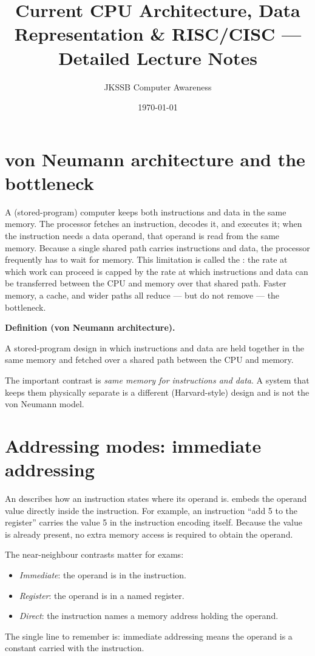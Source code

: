 \documentclass[11pt]{article}
\title{Current CPU Architecture, Data Representation \& RISC/CISC --- Detailed Lecture Notes}
\author{JKSSB Computer Awareness}
\date{\today}
\newenvironment{definitionbox}[1]{%
  \par\noindent\textbf{Definition (#1).}\ \itshape
}{\par\vspace{0.3em}}
\begin{document}
\maketitle

\section{von Neumann architecture and the bottleneck}
A  (stored-program) computer keeps both instructions and
data in the same memory. The processor fetches an instruction, decodes it,
and executes it; when the instruction needs a data operand, that operand is
read from the same memory. Because a single shared path carries instructions
and data, the processor frequently has to wait for memory. This limitation is
called the : the rate at which work can proceed is
capped by the rate at which instructions and data can be transferred between
the CPU and memory over that shared path. Faster memory, a cache, and wider
paths all reduce --- but do not remove --- the bottleneck.

\begin{definitionbox}{von Neumann architecture}
A stored-program design in which instructions and data are held together in
the same memory and fetched over a shared path between the CPU and memory.
\end{definitionbox}

The important contrast is \emph{same memory for instructions and data}. A
system that keeps them physically separate is a different (Harvard-style)
design and is not the von Neumann model.

\section{Addressing modes: immediate addressing}
An  describes how an instruction states where its
operand is.  embeds the operand value directly
inside the instruction. For example, an instruction ``add 5 to the register''
carries the value 5 in the instruction encoding itself. Because the value is
already present, no extra memory access is required to obtain the operand.

The near-neighbour contrasts matter for exams:
\begin{itemize}
  \item \emph{Immediate}: the operand is in the instruction.
  \item \emph{Register}: the operand is in a named register.
  \item \emph{Direct}: the instruction names a memory address holding the
    operand.
\end{itemize}
The single line to remember is: immediate addressing means the operand is a
constant carried with the instruction.
\end{document}
